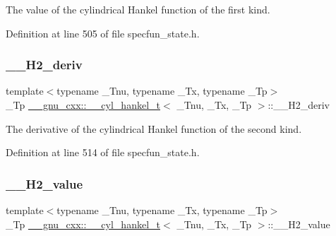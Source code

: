 The value of the cylindrical Hankel function of the first kind. 



Definition at line 505 of file specfun\+\_\+state.\+h.

\mbox{\label{struct____gnu__cxx_1_1____cyl__hankel__t_aac63a9d78d5e3ee6520073963da4cbbb}} 
\subsubsection{\texorpdfstring{\+\_\+\+\_\+\+H2\+\_\+deriv}{\_\_H2\_deriv}}
{\footnotesize\ttfamily template$<$typename \+\_\+\+Tnu, typename \+\_\+\+Tx, typename \+\_\+\+Tp$>$ \\
\+\_\+\+Tp \hyperlink{struct____gnu__cxx_1_1____cyl__hankel__t}{\+\_\+\+\_\+gnu\+\_\+cxx\+::\+\_\+\+\_\+cyl\+\_\+hankel\+\_\+t}$<$ \+\_\+\+Tnu, \+\_\+\+Tx, \+\_\+\+Tp $>$\+::\+\_\+\+\_\+\+H2\+\_\+deriv}



The derivative of the cylindrical Hankel function of the second kind. 



Definition at line 514 of file specfun\+\_\+state.\+h.

\mbox{\label{struct____gnu__cxx_1_1____cyl__hankel__t_a968496d4d370d39f2034657f32860faa}} 
\subsubsection{\texorpdfstring{\+\_\+\+\_\+\+H2\+\_\+value}{\_\_H2\_value}}
{\footnotesize\ttfamily template$<$typename \+\_\+\+Tnu, typename \+\_\+\+Tx, typename \+\_\+\+Tp$>$ \\
\+\_\+\+Tp \hyperlink{struct____gnu__cxx_1_1____cyl__hankel__t}{\+\_\+\+\_\+gnu\+\_\+cxx\+::\+\_\+\+\_\+cyl\+\_\+hankel\+\_\+t}$<$ \+\_\+\+Tnu, \+\_\+\+Tx, \+\_\+\+Tp $>$\+::\+\_\+\+\_\+\+H2\+\_\+value}



